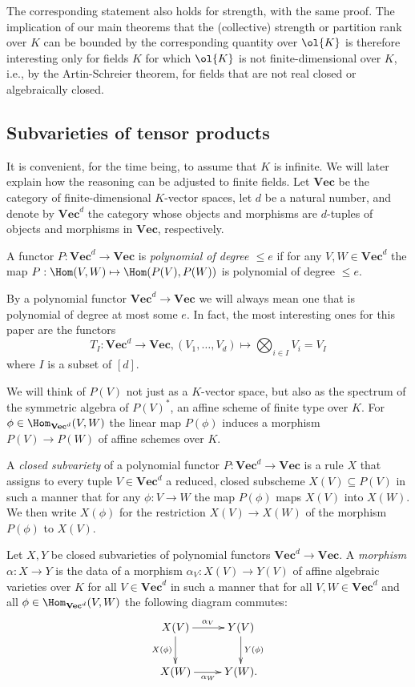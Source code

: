 \documentclass{amsart}
\renewcommand{\Vec}{\mathbf{Vec}}
\begin{document}
\begin{re}
The corresponding statement also holds for strength, with the same
proof. The implication of our main theorems that the (collective)
strength or partition rank over $K$ can be bounded by the
corresponding quantity over $\ol{K}$ is therefore interesting only
for fields $K$ for which $\ol{K}$ is not finite-dimensional over $K$,
i.e., by the Artin-Schreier theorem, for fields that are not
real closed or algebraically closed.
\end{re}

\subsection{Subvarieties of tensor products}

It is convenient, for the time being, to assume that $K$ is infinite.
We will later explain how the reasoning can be adjusted to finite fields.
Let $\Vec$ be the category of finite-dimensional $K$-vector spaces, 
let $d$ be a natural number, and denote by $\Vec^d$ the category whose
objects and morphisms are $d$-tuples of objects and morphisms in
$\Vec$, respectively. 

\begin{de}
A functor $P:\Vec^d \to \Vec$ is {\em polynomial of degree $\leq e$} if
for any $V,W \in \Vec^d$ the map $P:\Hom(V,W) \mapsto \Hom(P(V),P(W))$
is polynomial of degree $\leq e$.
\end{de}

By a polynomial functor $\Vec^d \to \Vec$ we will always mean one that
is polynomial of degree at most some $e$. In fact, the most interesting
ones for this paper are the functors
\[ T_I:\Vec^d \to \Vec, (V_1,\ldots,V_d) \mapsto \bigotimes_{i \in I}
V_i=V_I \]
where $I$ is a subset of $[d]$.

We will think of $P(V)$ not just as a $K$-vector space, but also as the
spectrum of the symmetric algebra of $P(V)^*$, an affine scheme of finite
type over $K$. For $\phi \in \Hom_{\Vec^d}(V,W)$ the linear map $P(\phi)$
induces a morphism $P(V) \to P(W)$ of affine schemes over $K$.

\begin{de}
A {\em closed subvariety} of a polynomial functor $P:\Vec^d \to \Vec$ is
a rule $X$ that assigns to every tuple $V \in \Vec^d$ a reduced, closed
subscheme $X(V) \subseteq P(V)$ in such a manner that for any $\phi:V
\to W$ the map $P(\phi)$ maps $X(V)$ into $X(W)$. We then write $X(\phi)$
for the restriction $X(V) \to X(W)$ of the morphism $P(\phi)$ to $X(V)$.

Let $X,Y$ be closed subvarieties of polynomial functors $\Vec^d \to \Vec$. A
{\em morphism} $\alpha:X \to Y$ is the data of a morphism $\alpha_V:X(V)
\to Y(V)$ of affine algebraic varieties over $K$ for all $V \in \Vec^d$
in such a manner that for all $V,W \in \Vec^d$ and all $\phi \in
\Hom_{\Vec^d}(V,W)$ the following diagram commutes:\\
\[
\xymatrix{
X(V) \ar[r]^{\alpha_V} \ar[d]_{X(\phi)} & Y(V) \ar[d]^{Y(\phi)} \\
X(W) \ar[r]_{\alpha_W} & Y(W). 
}
\]
\end{de}
\end{document}
